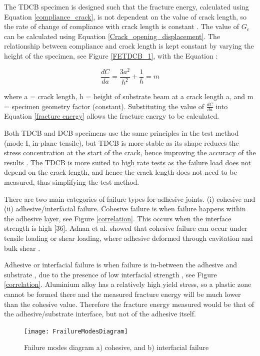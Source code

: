 \documentclass[numbers=noendperiod,chapterprefix=on]{icldt} %
\begin{document}
The TDCB specimen is designed such that the fracture energy, calculated using Equation \ref{compliance_crack}, is not dependent on the value of crack length, so the rate of change of compliance with crack length is constant \cite{Kinloch2008}. The value of $G_c$ can be calculated using Equation \ref{Crack_opening_displacement}. The relationship between compliance and crack length is kept constant by varying the height of the specimen, see Figure \ref{FETDCB_1}, with the Equation \cite{Kinloch1983,Kinloch1990}:

\begin{equation} \label{compliance_crack}
\frac{dC}{da}=\frac{3a^2}{h^2}+\frac{1}{h}=m
\end{equation}

where a = crack length, h = height of substrate beam at a crack length a, and m = specimen geometry factor (constant). Substituting the value of $\frac{dC}{da}$ into Equation \ref{fracture energy} allows the fracture energy to be calculated. 

Both TDCB and DCB specimens use the same principles in the test method (mode I, in-plane tensile), but TDCB is more stable as its shape reduces the stress concentration at the start of the crack, hence improving the accuracy of the results \cite{Kinloch1990}. The TDCB is more suited to high rate tests as the failure load does not depend on the crack length, and hence the crack length does not need to be measured, thus simplifying the test method.

There are two main categories of failure types for adhesive joints. (i) cohesive and (ii) adhesive/interfacial failure.
Cohesive failure is when failure happens within the adhesive layer, see Figure \ref{correlation}. This occurs when the interface strength is high \cite{BS7991}[36]. Adnan et al. \cite{BS7991} showed that cohesive failure can occur under tensile loading or shear loading, where adhesive deformed through cavitation and bulk shear \cite{BS7991}. 

Adhesive or interfacial failure is when failure is in-between the adhesive and substrate \cite{Blackman2003b}, due to the presence of low interfacial strength \cite{BS7991}, see Figure \ref{correlation}. Aluminium alloy has a relatively high yield stress, so a plastic zone cannot be formed there and the measured fracture energy will be much lower than the cohesive value. Therefore the fracture energy measured would be that of the adhesive/substrate interface, but not of the adhesive itself.

\begin{figure}[!htpb]
\centering
\texttt{[image: FrailureModesDiagram]}
\caption{Failure modes diagram a) cohesive, and b) interfacial failure \cite{Lee2006} } %
\end{figure}
\end{document}
